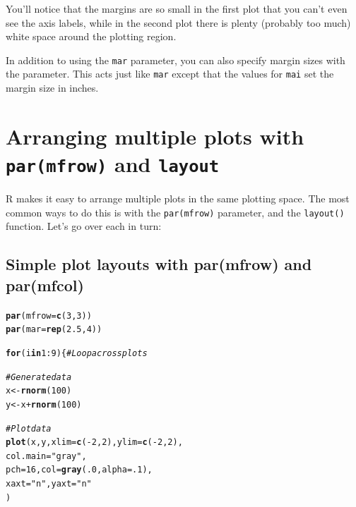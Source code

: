 \documentclass{tufte-book}\usepackage[]{graphicx}\usepackage[]{color}
\makeatletter
\newcommand{\hlnum}[1]{\textcolor[rgb]{0.686,0.059,0.569}{#1}}%
\newcommand{\hlstr}[1]{\textcolor[rgb]{0.192,0.494,0.8}{#1}}%
\newcommand{\hlcom}[1]{\textcolor[rgb]{0.678,0.584,0.686}{\textit{#1}}}%
\newcommand{\hlopt}[1]{\textcolor[rgb]{0,0,0}{#1}}%
\newcommand{\hlstd}[1]{\textcolor[rgb]{0.345,0.345,0.345}{#1}}%
\newcommand{\hlkwa}[1]{\textcolor[rgb]{0.161,0.373,0.58}{\textbf{#1}}}%
\newcommand{\hlkwb}[1]{\textcolor[rgb]{0.69,0.353,0.396}{#1}}%
\newcommand{\hlkwc}[1]{\textcolor[rgb]{0.333,0.667,0.333}{#1}}%
\newcommand{\hlkwd}[1]{\textcolor[rgb]{0.737,0.353,0.396}{\textbf{#1}}}%
\newenvironment{kframe}{%
 \def\at@end@of@kframe{}%
 \ifinner\ifhmode%
  \def\at@end@of@kframe{\end{minipage}}%
  \begin{minipage}{\columnwidth}%
 \fi\fi%
 \def\FrameCommand##1{\hskip\@totalleftmargin \hskip-\fboxsep
 \colorbox{shadecolor}{##1}\hskip-\fboxsep
     \hskip-\linewidth \hskip-\@totalleftmargin \hskip\columnwidth}%
 \MakeFramed {\advance\hsize-\width
   \@totalleftmargin\z@ \linewidth\hsize
   \@setminipage}}%
 {\par\unskip\endMakeFramed%
 \at@end@of@kframe}
\newenvironment{knitrout}{}{} %
\makeatother
\begin{document}
\begin{footnotesize}
\begin{footnotesize}
\begin{knitrout}
\end{knitrout}
\end{footnotesize}


You'll notice that the margins are so small in the first plot that you can't even see the axis labels, while in the second plot there is plenty (probably too much) white space around the plotting region.

In addition to using the \texttt{mar} parameter, you can also specify margin sizes with the  parameter. This acts just like \texttt{mar} except that the values for \texttt{mai} set the margin size in inches.


\pagebreak

\section{Arranging multiple plots with \texttt{par(mfrow)} and \texttt{layout}}

R makes it easy to arrange multiple plots in the same plotting space. The most common ways to do this is with the \texttt{par(mfrow)} parameter, and the \texttt{layout()} function. Let's go over each in turn:

\subsection{Simple plot layouts with par(mfrow) and par(mfcol)}

\begin{marginfigure}
\begin{tiny}
\begin{knitrout}
\color{fgcolor}\begin{kframe}
\begin{alltt}
\hlkwd{par}\hlstd{(}\hlkwc{mfrow} \hlstd{=} \hlkwd{c}\hlstd{(}\hlnum{3}\hlstd{,} \hlnum{3}\hlstd{))}
\hlkwd{par}\hlstd{(}\hlkwc{mar} \hlstd{=} \hlkwd{rep}\hlstd{(}\hlnum{2.5}\hlstd{,} \hlnum{4}\hlstd{))}

\hlkwa{for}\hlstd{(i} \hlkwa{in} \hlnum{1}\hlopt{:}\hlnum{9}\hlstd{) \{} \hlcom{# Loop across plots}

\hlcom{# Generate data  }
\hlstd{x} \hlkwb{<-} \hlkwd{rnorm}\hlstd{(}\hlnum{100}\hlstd{)}
\hlstd{y} \hlkwb{<-} \hlstd{x} \hlopt{+} \hlkwd{rnorm}\hlstd{(}\hlnum{100}\hlstd{)}

\hlcom{# Plot data}
  \hlkwd{plot}\hlstd{(x, y,} \hlkwc{xlim} \hlstd{=} \hlkwd{c}\hlstd{(}\hlopt{-}\hlnum{2}\hlstd{,} \hlnum{2}\hlstd{),} \hlkwc{ylim} \hlstd{=} \hlkwd{c}\hlstd{(}\hlopt{-}\hlnum{2}\hlstd{,} \hlnum{2}\hlstd{),}
       \hlkwc{col.main} \hlstd{=} \hlstr{"gray"}\hlstd{,}
       \hlkwc{pch} \hlstd{=} \hlnum{16}\hlstd{,} \hlkwc{col} \hlstd{=} \hlkwd{gray}\hlstd{(}\hlnum{.0}\hlstd{,} \hlkwc{alpha} \hlstd{=} \hlnum{.1}\hlstd{),}
       \hlkwc{xaxt} \hlstd{=} \hlstr{"n"}\hlstd{,} \hlkwc{yaxt} \hlstd{=} \hlstr{"n"}
       \hlstd{)}


\end{alltt}
\end{kframe}
\end{knitrout}
\end{tiny}
\end{marginfigure}
\end{footnotesize}
\end{document}
